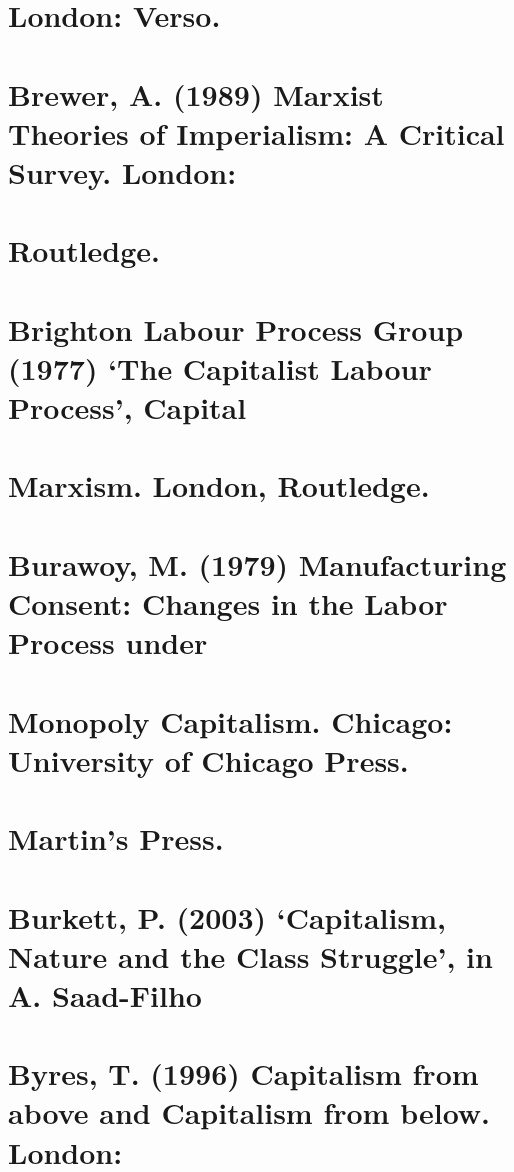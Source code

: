 \section{London: Verso.}


\section{Brewer, A. (1989) Marxist Theories of Imperialism: A Critical Survey. London:}


\section{Routledge.}


\section{Brighton Labour Process Group (1977) ‘The Capitalist Labour Process’, Capital}


\section{Marxism. London, Routledge.}


\section{Burawoy, M. (1979) Manufacturing Consent: Changes in the Labor Process under}


\section{Monopoly Capitalism. Chicago: University of Chicago Press.}


\section{Martin’s Press.}


\section{Burkett, P. (2003) ‘Capitalism, Nature and the Class Struggle’, in A. Saad-Filho}


\section{Byres, T. (1996) Capitalism from above and Capitalism from below. London:}


